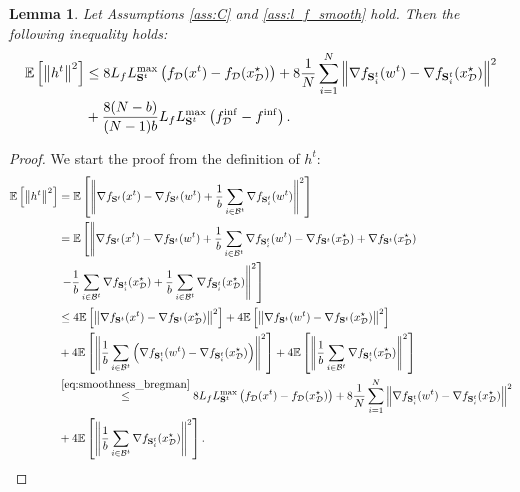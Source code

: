 \documentclass{article}
\newcommand{\bb}{\mathbb}
\newcommand{\cD}{\mathcal{D}}
\newcommand{\Exp}[1]{{\bb E}\left[#1\right]}
\newtheorem{lemma}{Lemma}
\theoremstyle{plain}
\newcommand{\tf}{f_{\mathcal{D}}}
\newcommand{\mS}{{\bf S}}
\theoremstyle{plain}
\theoremstyle{definition}
\theoremstyle{remark}
\begin{document}
\begin{lemma}
\label{lemma:moment-lsvrg}
	Let Assumptions \ref{ass:C} and \ref{ass:l_f_smooth} hold. Then the following inequality holds:
 \begin{equation*}
 \begin{split}
     \Exp{\left\|h^t\right\|^2} &\leq 8L_fL_{\mS^t}^{\max}\left(\tf(x^t) - \tf(x_\cD^\star)\right) + 8 \frac{1}{N}\sum_{i = 1}^{N}\left\|\nabla f_{\mS^t_i}(w^t) - \nabla f_{\mS^t_i}(x_\cD^\star)\right\|^2\\
     &+\frac{8(N-b)}{(N-1)b} L_fL_{\mS^t}^{\max}\left(\tf^{\inf} - f^{\inf}\right).
    \end{split}
 \end{equation*}
\end{lemma}
\begin{proof}
We start the proof from the definition of $h^t$:
	\begin{equation*}
		\begin{split}
			\Exp{\left\|h^t\right\|^2} &=\Exp{\left\|\nabla f_{\mS^t}(x^t) - \nabla f_{\mS^t}(w^t) + \frac{1}{b}\sum_{i\in\mathcal{B}^t}\nabla f_{\mS^t_i}(w^t)\right\|^2}\\
			& = \mathbb{E}\left[\left\|\nabla f_{\mS^t}(x^t) - \nabla f_{\mS^t}(w^t) + \frac{1}{b}\sum_{i\in\mathcal{B}^t}\nabla f_{\mS^t_i}(w^t) - \nabla f_{\mS^t}(x_\cD^\star) + \nabla f_{\mS^t}(x_\cD^\star)\right.\right.\\
			&\left.\left. - \frac{1}{b}\sum_{i\in\mathcal{B}^t}\nabla f_{\mS^t_i}(x_\cD^\star) + \frac{1}{b}\sum_{i\in\mathcal{B}^t}\nabla f_{\mS^t_i}(x_\cD^\star)\right\|^2\right]\\
			& \leq 4\Exp{\left\|\nabla f_{\mS^t}(x^t) - \nabla f_{\mS^t}(x_\cD^\star)\right\|^2} + 4\Exp{\left\|\nabla f_{\mS^t}(w^t) - \nabla f_{\mS^t}(x_\cD^\star)\right\|^2}\\
			& + 4\Exp{\left\|\frac{1}{b}\sum_{i\in\mathcal{B}^t}\left(\nabla f_{\mS^t_i}(w^t) - \nabla f_{\mS^t_i}(x_\cD^\star)\right)\right\|^2} + 4\Exp{\left\|\frac{1}{b}\sum_{i\in\mathcal{B}^t}\nabla f_{\mS^t_i}(x_\cD^\star)\right\|^2}\\
			& \stackrel{\eqref{eq:smoothness_bregman}}{\leq} 8L_fL_{\mS^t}^{\max}\left(\tf(x^t) - \tf(x_\cD^\star)\right) + 8 \frac{1}{N}\sum_{i = 1}^{N}\left\|\nabla f_{\mS^t_i}(w^t) - \nabla f_{\mS^t_i}(x_\cD^\star)\right\|^2\\ & + 4\Exp{\left\|\frac{1}{b}\sum_{i\in\mathcal{B}^t}\nabla f_{\mS^t_i}(x_\cD^\star)\right\|^2}.
		\end{split}
	\end{equation*}

\end{proof}
\end{document}
